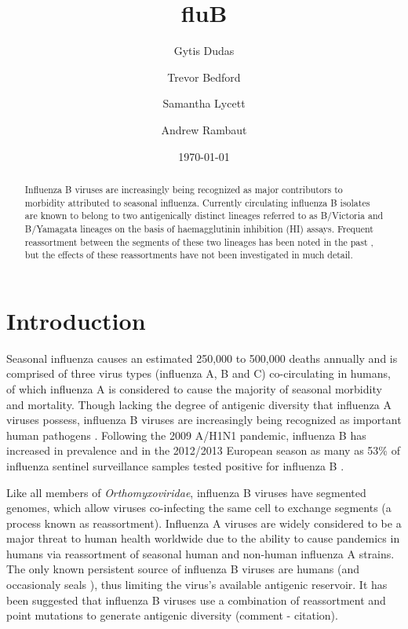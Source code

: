 \documentclass[11pt,oneside,letterpaper]{article}
\title{\vspace{1.0cm} \LARGE \bf fluB}
\author[1]{Gytis Dudas}
\author[2]{Trevor Bedford}
\author[1]{Samantha Lycett}
\author[1,3]{Andrew Rambaut}
\affil[1]{Institute of Evolutionary Biology, University of Edinburgh, Edinburgh, UK}
\affil[2]{Vaccine and Infectious Disease Division, Fred Hutchinson Cancer Research Center, Seattle, WA, USA.}
\affil[3]{Fogarty International Center, National Institutes of Health, Bethesda, MD, USA.}
\date{\today}
\begin{document}
\maketitle

\begin{abstract}

Influenza B viruses are increasingly being recognized as major contributors to morbidity attributed to seasonal influenza. 
Currently circulating influenza B isolates are known to belong to two antigenically distinct lineages referred to as B/Victoria and B/Yamagata lineages on the basis of haemagglutinin inhibition (HI) assays. 
Frequent reassortment between the segments of these two lineages has been noted in the past \cite{lindstrom1999}, but the effects of these reassortments have not been investigated in much detail.

\end{abstract}

\pagebreak


\section*{Introduction}
Seasonal influenza causes an estimated 250,000 to 500,000 deaths annually and is comprised of three virus types (influenza A, B and C) co-circulating in humans, of which influenza A is considered to cause the majority of seasonal morbidity and mortality.
Though lacking the degree of antigenic diversity that influenza A viruses possess, influenza B viruses are increasingly being recognized as important human pathogens \cite{paul-glezen2013}.
Following the 2009 A/H1N1 pandemic, influenza B has increased in prevalence and in the 2012/2013 European season as many as 53\% of influenza sentinel surveillance samples tested positive for influenza B \cite{ECDC1213}. 

Like all members of \textit{Orthomyxoviridae}, influenza B viruses have segmented genomes, which allow viruses co-infecting the same cell to exchange segments (a process known as reassortment). 
Influenza A viruses are widely considered to be a major threat to human health worldwide due to the ability to cause pandemics in humans via reassortment of seasonal human and non-human influenza A strains. 
The only known persistent source of influenza B viruses are humans (and occasionaly seals \cite{osterhaus2000}), thus limiting the virus's available antigenic reservoir. 
It has been suggested that influenza B viruses use a combination of reassortment and point mutations to generate antigenic diversity (comment - citation).
\end{document}
